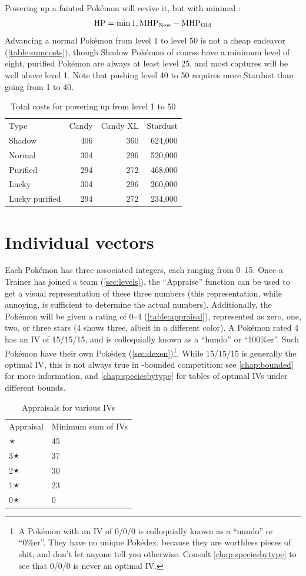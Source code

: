 Powering up a fainted Pokémon will revive it, but with minimal \HP\@:
\[ \mbox{HP} = \min{1, \mbox{MHP}_\mathrm{New} - \mbox{MHP}_\mathrm{Old} } \]
Advancing a normal Pokémon from level 1 to level 50 is not a cheap endeavor (\autoref{table:sumcosts}),
  though Shadow Pokémon of course have a minimum level of eight, purified Pokémon are always
  at least level 25, and most captures will be well above level 1.
Note that pushing level 40 to 50 requires more Stardust than going from 1 to 40.
\begin{table}[ht]
\centering
\begin{tabular}{lrrr}
  Type & Candy & Candy XL & Stardust\\
\Midrule
        Shadow & 406 & 360 & 624,000\\
        Normal & 304 & 296 & 520,000\\
      Purified & 294 & 272 & 468,000\\
         Lucky & 304 & 296 & 260,000\\
Lucky purified & 294 & 272 & 234,000\\
\end{tabular}
\caption{Total costs for powering up from level 1 to 50\label{table:sumcosts}}
\end{table}

\section{Individual vectors\label{sec:ivs}}
Each Pokémon has three associated integers, each ranging from 0--15.
Once a Trainer has joined a team (\autoref{sec:levels}), the ``Appraise'' function can be used to
  get a visual representation of these three numbers (this representation,
  while annoying, is sufficient to determine the actual numbers).
Additionally, the Pokémon will be given a rating of 0--4 (\autoref{table:appraisal}), represented as
  zero, one, two, or three stars (4 shows three, albeit in a different color).
A Pokémon rated 4 has an IV of 15/15/15, and is colloquially known as a ``hundo'' or ``100\%er''.
Such Pokémon have their own Pokédex (\autoref{sec:dexen})\footnote{A Pokémon with an IV of 0/0/0
 is colloquially known as a ``nundo'' or ``0\%er''. They have no unique Pokédex, because they are worthless pieces of shit,
  and don't let anyone tell you otherwise. Consult \autoref{chap:speciesbytype} to see that 0/0/0 is never an optimal IV.}.
While 15/15/15 is generally the optimal IV, this is not always true in \CP-bounded
  competition; see \autoref{chap:bounded} for more information,
  and \autoref{chap:speciesbytype} for tables of optimal IVs under different \CP{} bounds.
\begin{table}
\centering
\footnotesize
\begin{tabular}{ll}
Appraisal & Minimum sum of IVs\\
\Midrule
4🟉 & 45\\
3🟉 & 37\\
2🟉 & 30\\
1🟉 & 23\\
0🟉 & 0\\
\end{tabular}
\caption{Appraisals for various IVs\label{table:appraisal}}
\end{table}


